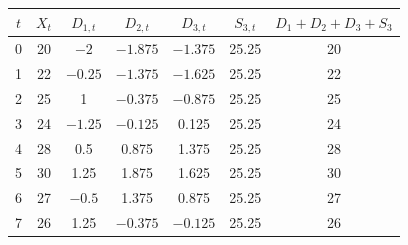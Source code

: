 \begin{tabular}{ccccccc}
\toprule
$t$ & $X_t$ & $D_{1,t}$ & $D_{2,t}$ & $D_{3,t}$ & $S_{3,t}$ & $D_1{+}D_2{+}D_3{+}S_3$ \\
\midrule
0 & 20 & $-2$ & $-1.875$ & $-1.375$ & 25.25 & 20 \\
1 & 22 & $-0.25$ & $-1.375$ & $-1.625$ & 25.25 & 22 \\
2 & 25 & 1 & $-0.375$ & $-0.875$ & 25.25 & 25 \\
3 & 24 & $-1.25$ & $-0.125$ & 0.125 & 25.25 & 24 \\
4 & 28 & 0.5 & 0.875 & 1.375 & 25.25 & 28 \\
5 & 30 & 1.25 & 1.875 & 1.625 & 25.25 & 30 \\
6 & 27 & $-0.5$ & 1.375 & 0.875 & 25.25 & 27 \\
7 & 26 & 1.25 & $-0.375$ & $-0.125$ & 25.25 & 26 \\
\bottomrule
\end{tabular}